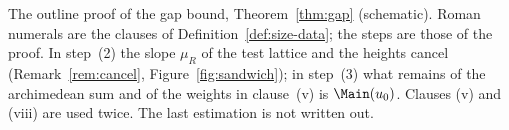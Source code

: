 \caption{The outline proof of the gap bound, Theorem~\ref{thm:gap}
(schematic). Roman numerals are the clauses of
Definition~\ref{def:size-data}; the steps are those of the proof. In
step~(2) the slope $\mu_R$ of the test lattice and the heights cancel
(Remark~\ref{rem:cancel}, Figure~\ref{fig:sandwich}); in step~(3) what remains of the
archimedean sum and of the weights in clause~(v) is $\Main(u_0)$. Clauses (v) and (viii) are used twice. The last
estimation is not written out.}
\label{fig:gap-flow}
